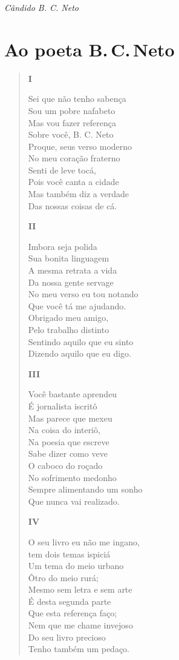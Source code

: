\hfill\emph{Cândido B. C. Neto}

\chapter{Ao poeta B.\,C.\,Neto}

\begin{verse}
\textbf{I}

Sei que não tenho sabença\\
Sou um pobre nafabeto\\
Mas vou fazer referença\\
Sobre você, B. C. Neto\\
Proque, seus verso moderno\\
No meu coração fraterno\\
Senti de leve tocá,\\
Pois você canta a cidade\\
Mas também diz a verdade\\
Das nossas coisas de cá.

\textbf{II}

Imbora seja polida\\
Sua bonita linguagem\\
A mesma retrata a vida\\
Da nossa gente servage\\
No meu verso eu tou notando\\
Que você tá me ajudando.\\
Obrigado meu amigo,\\
Pelo trabalho distinto\\
Sentindo aquilo que eu sinto\\
Dizendo aquilo que eu digo.

\textbf{III}

Você bastante aprendeu\\
É jornalista iscritô\\
Mas parece que mexeu\\
Na coisa do interiô,\\
Na poesia que escreve\\
Sabe dizer como veve\\
O caboco do roçado\\
No sofrimento medonho\\
Sempre alimentando um sonho\\
Que nunca vai realizado.

\textbf{IV}

O seu livro eu não me ingano,\\
tem dois temas ispiciá\\
Um tema do meio urbano\\
Ôtro do meio rurá;\\
Mesmo sem letra e sem arte\\
É desta segunda parte\\
Que esta referença faço;\\
Nem que me chame invejoso\\
Do seu livro precioso\\
Tenho também um pedaço.


\end{verse}
